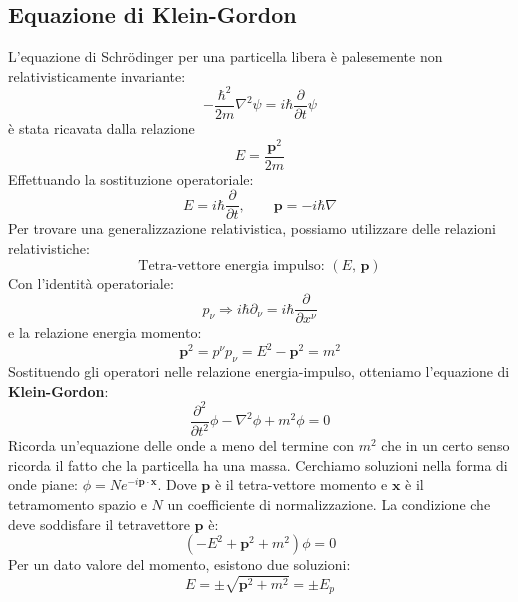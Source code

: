 \subsection{Equazione di Klein-Gordon}
L'equazione di Schr\"odinger per una particella libera è palesemente non relativisticamente invariante:
\begin{equation*}
    -\frac{\hbar^2}{2m}\nabla^2\psi=i\hbar\frac{\partial}{\partial t}\psi
\end{equation*}
è stata ricavata dalla relazione 
\begin{equation*}
    E=\frac{\mathbf{p}^2}{2m}
\end{equation*}
Effettuando la sostituzione operatoriale:
\begin{equation*}
    E=i\hbar\frac{\partial}{\partial t},\qquad \mathbf{p}=-i\hbar \nabla
\end{equation*}
Per trovare una generalizzazione relativistica, possiamo utilizzare delle relazioni relativistiche:
\begin{equation*}
    \text{Tetra-vettore energia impulso: } (E,\,\mathbf{p})
\end{equation*}
Con l'identità operatoriale:
\begin{equation*}
    p_\nu\Rightarrow i\hbar\partial_\nu=i\hbar\frac{\partial}{\partial x^{\nu}}
\end{equation*}
e la relazione energia momento:
\begin{equation*}
    \mathbf{p}^2=p^\nu p_\nu=E^2-\mathbf{p}^2=m^2
\end{equation*}
Sostituendo gli operatori nelle relazione energia-impulso, otteniamo l'equazione di \textbf{Klein-Gordon}:
\begin{equation*}
    \frac{\partial^2}{\partial t^2}\phi-\nabla^2\phi+m^2\phi=0
\end{equation*}
Ricorda un'equazione delle onde a meno del termine con $m^2$ che in un certo senso ricorda il fatto che la particella ha una massa. Cerchiamo soluzioni nella forma di onde piane: $\phi=Ne^{-i\mathbf{p}\cdot\mathbf{x}}$. Dove $\mathbf{p}$ è il tetra-vettore momento e $\mathbf{x}$ è il tetramomento spazio e $N$ un coefficiente di normalizzazione. La condizione che deve soddisfare il tetravettore $\mathbf{p}$ è:
\begin{equation*}
    (-E^2+\mathbf{p}^2+m^2)\phi=0
\end{equation*}
Per un dato valore del momento, esistono due soluzioni:
\begin{equation*}
    E=\pm\sqrt{\mathbf{p}^2+m^2}=\pm E_p
\end{equation*}
